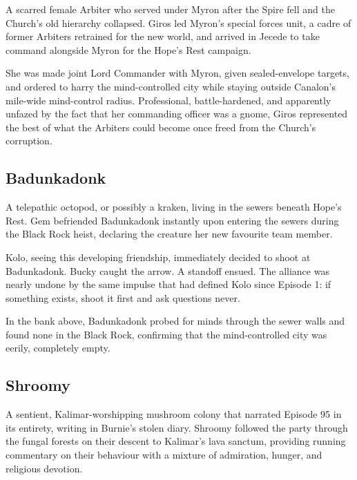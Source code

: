 \noindent

A scarred female Arbiter who served under Myron after the Spire fell and the Church's old hierarchy collapsed.  Giros led Myron's special forces unit, a cadre of former Arbiters retrained for the new world, and arrived in Jecede to take command alongside Myron for the Hope's Rest campaign.

She was made joint Lord Commander with Myron, given sealed-envelope targets, and ordered to harry the mind-controlled city while staying outside Canalon's mile-wide mind-control radius.  Professional, battle-hardened, and apparently unfazed by the fact that her commanding officer was a gnome, Giros represented the best of what the Arbiters could become once freed from the Church's corruption.

\smallskip

\subsection*{Badunkadonk}

\noindent

A telepathic octopod, or possibly a kraken, living in the sewers beneath Hope's Rest.  Gem befriended Badunkadonk instantly upon entering the sewers during the Black Rock heist, declaring the creature her new favourite team member.

Kolo, seeing this developing friendship, immediately decided to shoot at Badunkadonk.  Bucky caught the arrow.  A standoff ensued.  The alliance was nearly undone by the same impulse that had defined Kolo since Episode 1: if something exists, shoot it first and ask questions never.

In the bank above, Badunkadonk probed for minds through the sewer walls and found none in the Black Rock, confirming that the mind-controlled city was eerily, completely empty.

\smallskip

\subsection*{Shroomy}

\noindent

A sentient, Kalimar-worshipping mushroom colony that narrated Episode 95 in its entirety, writing in Burnie's stolen diary.  Shroomy followed the party through the fungal forests on their descent to Kalimar's lava sanctum, providing running commentary on their behaviour with a mixture of admiration, hunger, and religious devotion.

